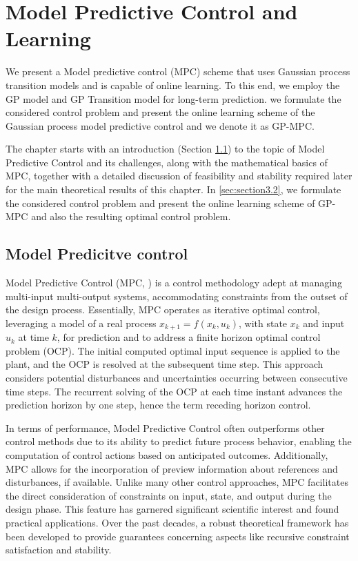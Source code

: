 \section{Model Predictive Control and Learning}	\label{sec: MPC_3}
We present a Model predictive control (MPC) scheme that uses Gaussian process transition models and is capable of online learning. To this end, we employ the GP model and GP Transition model for long-term prediction. we formulate the considered control problem and present the online learning scheme of the Gaussian process model predictive control and we denote it as GP-MPC. 


The chapter starts with an introduction (Section \ref{sec:section3.1}) to the topic of Model Predictive Control and its challenges, along with the mathematical basics of MPC, together with a detailed discussion of feasibility and stability required later for the main theoretical results of this chapter. In \ref{sec:section3.2}, we formulate the considered control problem and present the online learning scheme of GP-MPC and also the resulting optimal control problem. 


\subsection{Model Predicitve control}\label{sec:section3.1}
Model Predictive Control (MPC, \cite{rawlings2009model}) is a control methodology adept at managing multi-input multi-output systems, accommodating constraints from the outset of the design process. Essentially, MPC operates as iterative optimal control, leveraging a model of a real process $x_{k+1} = f(x_k,u_k)$, with state $x_k$ and input $u_k$ at time $k$, for prediction and to address a finite horizon optimal control problem (OCP). The initial computed optimal input sequence is applied to the plant, and the OCP is resolved at the subsequent time step. This approach considers potential disturbances and uncertainties occurring between consecutive time steps. The recurrent solving of the OCP at each time instant advances the prediction horizon by one step, hence the term receding horizon control\cite{mayne2000constrained}.

In terms of performance, Model Predictive Control often outperforms other control methods due to its ability to predict future process behavior, enabling the computation of control actions based on anticipated outcomes. Additionally, MPC allows for the incorporation of preview information about references and disturbances, if available. Unlike many other control approaches, MPC facilitates the direct consideration of constraints on input, state, and output during the design phase. This feature has garnered significant scientific interest and found practical applications. Over the past decades, a robust theoretical framework has been developed to provide guarantees concerning aspects like recursive constraint satisfaction and stability.

